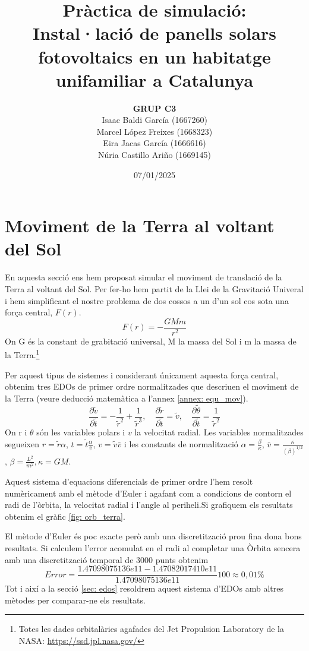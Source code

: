 \documentclass[11pt]{article}
\title{\Huge\bfseries Pràctica de simulació: \\ Instal·lació de panells solars fotovoltaics en un habitatge unifamiliar a Catalunya \\ [2ex] \Large}
\author{\begin{tabular}{c}
\textbf{GRUP C3} \\
Isaac Baldi García (1667260)\\
Marcel López Freixes (1668323) \\
Eira Jacas García (1666616) \\
Núria Castillo Ariño (1669145)
\end{tabular}}
\date{07/01/2025}
\begin{document}
\maketitle
\newpage

\tableofcontents
\newpage

\section{Moviment de la Terra al voltant del Sol} \label{sec: seccio_1}
En aquesta secció ens hem proposat simular el moviment de translació de la Terra al voltant del Sol. Per fer-ho hem partit de la Llei de la Gravitació Univeral i hem simplificant el nostre problema de dos cossos a un d'un sol cos sota una força central, $F(r)$.
\begin{equation}
    F(r)=-\frac{GMm}{r^2}
\end{equation}
On G és la constant de grabitació universal, M la massa del Sol i m la massa de la Terra.\footnote{Totes les dades orbitalàries agafades del Jet Propulsion Laboratory de la NASA: \url{https://ssd.jpl.nasa.gov/}}

Per aquest tipus de sistemes i considerant únicament aquesta força central, obtenim tres EDOs de primer ordre normalitzades que descriuen el moviment de la Terra (veure deducció matemàtica a l'annex \ref{annex: equ_mov}).
\begin{equation}
    \frac{\partial\tilde{v}}{\partial\tilde{t}}=-\frac{1}{\tilde{r}^2}+\frac{1}{\tilde{r}^3}, \quad
    \frac{\partial\tilde{r}}{\partial\tilde{t}}=\tilde{v}, \quad
    \frac{\partial\tilde{\theta}}{\partial\tilde{t}}=\frac{1}{\tilde{r}^2}
    \label{eq:all}
\end{equation}
On r i $\theta$ són les variables polars i $v$ la velocitat radial. Les variables normalitzades segueixen $r=\tilde{r}\alpha$, $t=\tilde{t}\frac{\alpha}{\bar{v}}$, $v=\tilde{v}\bar{v}$ i les constants de normalització $\alpha = \frac{\beta}{\kappa}$, $\bar{v}=\frac{\kappa}{(\beta)^{1/2}}$, $\beta=\frac{L^2}{m^2}, \kappa=GM$. 

Aquest sistema d'equacions diferencials de primer ordre l'hem resolt numèricament amb el mètode d'Euler i agafant com a condicions de contorn el radi de l'òrbita, la velocitat radial i l'angle al periheli.\footnotemark[\value{footnote}]
Si grafiquem els resultats obtenim el gràfic \ref{fig: orb_terra}.

El mètode d'Euler és poc exacte però amb una discretització prou fina dona bons resultats. Si calculem l'error acomulat en el radi al completar una Òrbita sencera amb una discretització temporal de $3000$ punts obtenim
\begin{equation}
    Error = \frac{1.47098075136e11-1.47082017410e11}{1.47098075136e11}100\approx0,01\%
\end{equation}
Tot i així a la secció \ref{sec: edos} resoldrem aquest sistema d'EDOs amb altres mètodes per comparar-ne els resultats.
\end{document}
